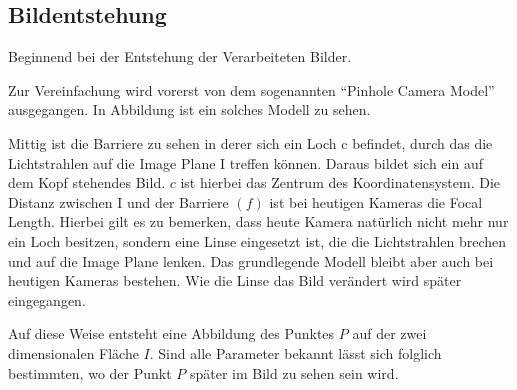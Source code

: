 \subsection{Bildentstehung}
Beginnend bei der Entstehung der Verarbeiteten Bilder. 

Zur Vereinfachung wird vorerst von dem sogenannten "`Pinhole Camera Model"' ausgegangen. In Abbildung  ist ein solches Modell zu sehen. 

Mittig ist die Barriere zu sehen in derer sich ein Loch c befindet, durch das die Lichtstrahlen auf die Image Plane I treffen können. Daraus bildet sich ein auf dem Kopf stehendes Bild. $c$ ist hierbei das Zentrum des Koordinatensystem.
Die Distanz zwischen I und der Barriere $(f)$ ist bei heutigen Kameras die Focal Length. Hierbei gilt es zu bemerken, dass heute Kamera natürlich nicht mehr nur ein Loch besitzen, sondern eine Linse eingesetzt ist, die die Lichtstrahlen brechen und auf die Image Plane lenken. Das grundlegende Modell bleibt aber auch bei heutigen Kameras bestehen. Wie die Linse das Bild verändert wird später eingegangen. 

Auf diese Weise entsteht eine Abbildung des Punktes $P$ auf der zwei dimensionalen Fläche $I$. Sind alle Parameter bekannt lässt sich folglich bestimmten, wo der Punkt $P$ später im Bild zu sehen sein wird. 

